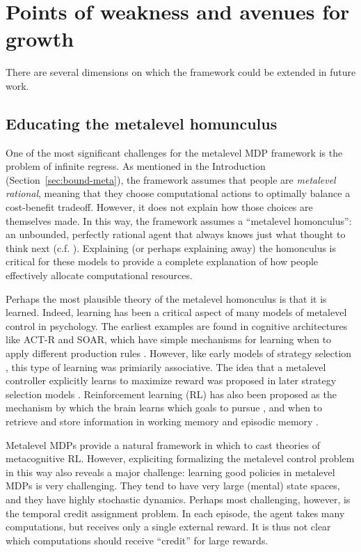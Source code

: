 \section{Points of weakness and avenues for growth}

There are several dimensions on which the framework could be extended in future work.

\subsection{Educating the metalevel homunculus}

One of the most significant challenges for the metalevel MDP framework is the problem of infinite regress. As mentioned in the Introduction (Section~\ref{sec:bound-meta}), the framework assumes that people are \emph{metalevel rational}, meaning that they choose computational actions to optimally balance a cost-benefit tradeoff. However, it does not explain how those choices are themselves made. In this way, the framework assumes a ``metalevel homonculus'': an unbounded, perfectly rational agent that always knows just what thought to think next (c.f. \citealp{hazy2006banishing,botvinick2014computational}). Explaining (or perhaps explaining away) the homonculus is critical for these models to provide a complete explanation of how people effectively allocate computational resources.

Perhaps the most plausible theory of the metalevel homonculus is that it is learned. Indeed, learning has been a critical aspect of many models of metalevel control in psychology. The earliest examples are found in cognitive architectures like ACT-R and SOAR, which have simple mechanisms for learning when to apply different production rules \citep{laird1986chunking}. However, like early models of strategy selection \citep{shrager1998scads}, this type of learning was primiarily associative. The idea that a metalevel controller explicitly learns to maximize reward was proposed in later strategy selection models \citet{erev2005adaptation,rieskamp2006ssl,lieder2017strategy}. Reinforcement learning (RL) has also been proposed as the mechanism by which the brain learns which goals to pursue \citep{cushman2015habitual}, and when to retrieve and store information in working memory \citep{oreilly2006making,todd2008learning} and episodic memory \citep{lu2022neural}. 

Metalevel MDPs provide a natural framework in which to cast theories of metacognitive RL. However, expliciting formalizing the metalevel control problem in this way also reveals a major challenge: learning good policies in metalevel MDPs is very challenging. They tend to have very large (mental) state spaces, and they have highly stochastic dynamics. Perhaps most challenging, however, is the temporal credit assignment problem. In each episode, the agent takes many computations, but receives only a single external reward. It is thus not clear which computations should receive ``credit'' for large rewards. 

